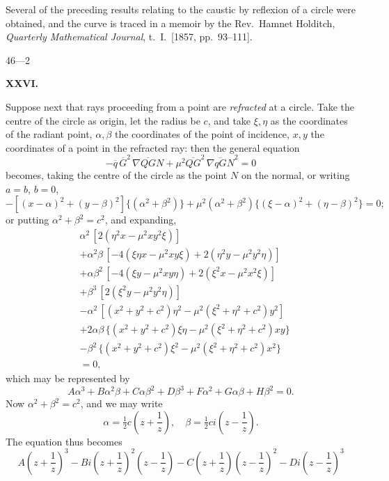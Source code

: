 \documentclass[11pt]{article}
\begin{document}
Several of the preceding results relating to the caustic by reflexion of a circle were obtained, and the curve is traced in a memoir by the Rev.\ Hamnet Holditch, \textit{Quarterly Mathematical Journal}, t.\ I.\ [1857, pp.\ 93--111].

\hfill 46---2

\newpage

\begin{center}\textbf{XXVI.}\end{center}
Suppose next that rays proceeding from a point are \textit{refracted} at a circle. Take the centre of the circle as origin, let the radius be $c$, and take $\xi,\eta$ as the coordinates of the radiant point, $\alpha,\beta$ the coordinates of the point of incidence, $x,y$ the coordinates of a point in the refracted ray: then the general equation
\[
-\overline{q}\,\overline{G}^2\,\overline{\nabla Q G N} + \mu^2 \overline{Q G}^2\,\overline{\nabla q G N}^2 = 0
\]
becomes, taking the centre of the circle as the point $N$ on the normal, or writing $a = b$, $b = 0$,
\[
-[(x-\alpha)^2 + (y-\beta)^2]\{(\alpha^2+\beta^2)\} + \mu^2 (\alpha^2 + \beta^2)\{(\xi-\alpha)^2 + (\eta-\beta)^2\} = 0;
\]
or putting $\alpha^2 + \beta^2 = c^2$, and expanding,
\begin{align*}
&\alpha^2\,[2(\eta^2 x - \mu^2 xy^2 \xi)] \\
&+\alpha^2 \beta\,[-4(\xi \eta x - \mu^2 xy \xi) + 2(\eta^2 y - \mu^2 y^2 \eta)] \\
&+\alpha \beta^2\,[-4(\xi y - \mu^2 xy \eta) + 2(\xi^2 x - \mu^2 x^2 \xi)] \\
&+\beta^3\,[2(\xi^2 y - \mu^2 y^2 \eta)] \\
&-\alpha^2\,[(x^2 + y^2 + c^2)\eta^2 - \mu^2 (\xi^2 + \eta^2 + c^2)y^2] \\
&+ 2\alpha\beta\,\{(x^2 + y^2 + c^2)\xi\eta - \mu^2 (\xi^2 + \eta^2 + c^2)xy\} \\
&-\beta^2\,\{(x^2 + y^2 + c^2)\xi^2 - \mu^2 (\xi^2 + \eta^2 + c^2)x^2\} \\
&= 0,
\end{align*}
which may be represented by
\[
A\alpha^3 + B\alpha^2 \beta + C\alpha\beta^2 + D\beta^3 + F\alpha^2 + G\alpha\beta + H\beta^2 = 0.
\]
Now $\alpha^2 + \beta^2 = c^2$, and we may write
\[
\alpha = \tfrac{1}{2}c\!\left(z + \frac{1}{z}\right), \quad \beta = \tfrac{1}{2}ci\!\left(z - \frac{1}{z}\right).
\]
The equation thus becomes
\[
A\!\left(z + \frac{1}{z}\right)^3 - Bi\!\left(z + \frac{1}{z}\right)^2\!\left(z - \frac{1}{z}\right) - C\!\left(z + \frac{1}{z}\right)\!\left(z - \frac{1}{z}\right)^2 - Di\!\left(z - \frac{1}{z}\right)^3
\]
\end{document}
